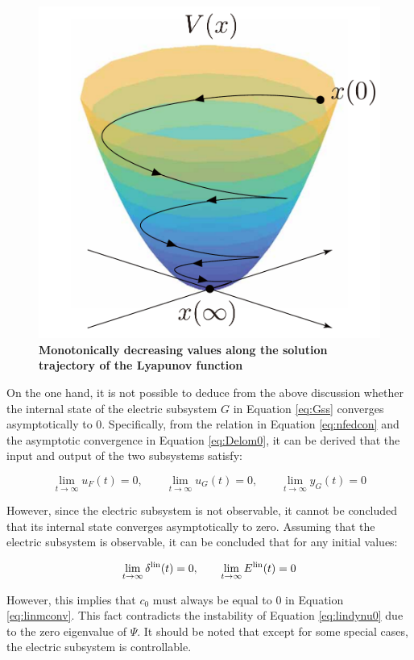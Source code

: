 \documentclass[graybox, envcountchap]{svmult}
\begin{document}
\begin{figure}[ht]
  \centering
  \includegraphics[width = .35\linewidth]{figs/cone}
  \caption{\textbf{Monotonically decreasing values along the solution trajectory of the Lyapunov function}}
  \label{fig:conelyap}
  \medskip
\end{figure}

On the one hand, it is not possible to deduce from the above discussion whether
the internal state of the electric subsystem $G$ in Equation \ref{eq:Gss}
converges asymptotically to 0.  Specifically, from the relation in Equation
\ref{eq:nfedcon} and the asymptotic convergence in Equation \ref{eq:Delom0}, it
can be derived that the input and output of the two subsystems satisfy:

\[
  \lim_{t\rightarrow \infty} u_F(t)  =0,\qquad
  \lim_{t\rightarrow \infty} u_G(t)  =0,\qquad
  \lim_{t\rightarrow \infty} y_G(t)  =0
\]

However, since the electric subsystem is not observable, it cannot be concluded
that its internal state converges asymptotically to zero.  Assuming that the
electric subsystem is observable, it can be concluded that for any initial
values:

\[
  \lim_{t\rightarrow \infty}  \delta^{\rm lin}(t)  =0,\qquad
  \lim_{t\rightarrow \infty}  E^{\rm lin}(t)  =0
\]

However, this implies that $c_0$ must always be equal to 0 in Equation
\ref{eq:linmconv}. This fact contradicts the instability of Equation
\ref{eq:lindynu0} due to the zero eigenvalue of $\Psi$. It should be noted that
except for some special cases, the electric subsystem is controllable.
\end{document}
